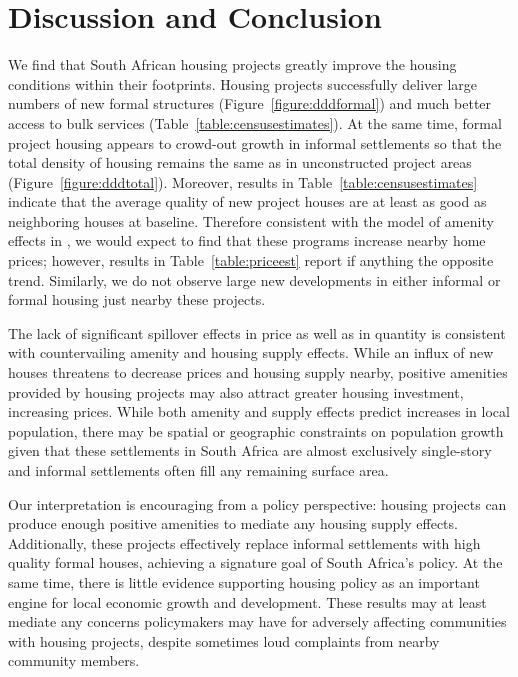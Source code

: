 \documentclass[12pt]{article}
\begin{document}
\section{Discussion and Conclusion}\label{section:discussion}

We find that South African housing projects greatly improve the housing conditions within their footprints.  Housing projects successfully deliver large numbers of new formal structures (Figure~\ref{figure:dddformal}) and much better access to bulk services (Table~\ref{table:censusestimates}).  At the same time, formal project housing appears to crowd-out growth in informal settlements so that the total density of housing remains the same as in unconstructed project areas (Figure~\ref{figure:dddtotal}).  Moreover, results in Table~\ref{table:censusestimates} indicate that the average quality of new project houses are at least as good as neighboring houses at baseline.  Therefore consistent with the model of amenity effects in \cite{diamond2016wants}, we would expect to find that these programs increase nearby home prices; however, results in Table~\ref{table:priceest} report if anything the opposite trend.  Similarly, we do not observe large new developments in either informal or formal housing just nearby these projects.

The lack of significant spillover effects in price as well as in quantity is consistent with countervailing amenity and housing supply effects.  While an influx of new houses threatens to decrease prices and housing supply nearby, positive amenities provided by housing projects may also attract greater housing investment, increasing prices.  While both amenity and supply effects predict increases in local population, there may be spatial or geographic constraints on population growth given that these settlements in South Africa are almost exclusively single-story and informal settlements often fill any remaining surface area.

Our interpretation is encouraging from a policy perspective: housing projects can produce enough positive amenities to mediate any housing supply effects.  Additionally, these projects effectively replace informal settlements with high quality formal houses, achieving a signature goal of South Africa's policy.  At the same time, there is little evidence supporting housing policy as an important engine for local economic growth and development.  These results may at least mediate any concerns policymakers may have for adversely affecting communities with housing projects, despite sometimes loud complaints from nearby community members.
\end{document}
